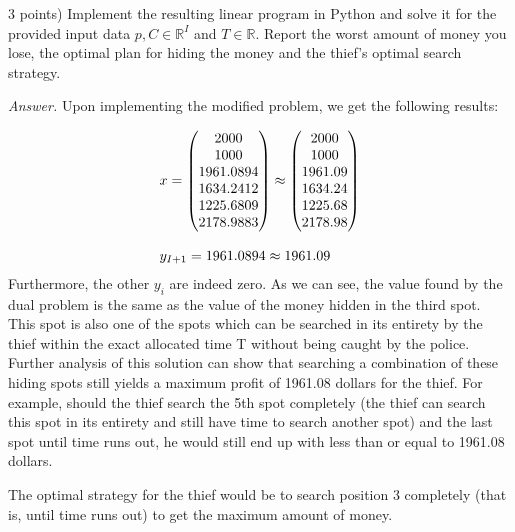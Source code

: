 \documentclass[10pt]{article}
\newenvironment{exercise}[2][Exercise]{\begin{trivlist}
  \item[\hskip \labelsep {\bfseries #1}\hskip \labelsep {\bfseries #2.}]}{\end{trivlist}}
\begin{document}
\begin{exercise}{5.5} (3 points) Implement the resulting linear program in Python and solve it for the provided input data $p, C \in \mathbb{R}^I$ and $T \in \mathbb{R}$. Report the worst amount of money you lose, the optimal plan for hiding the money and the thief's optimal search strategy. 

\textit{Answer.}
Upon implementing the modified problem, we get the following results:

\begin{equation}
\begin{array}{ll@{}lll}
x = \begin{pmatrix}
2000\\
1000\\
1961.0894\\
1634.2412\\
1225.6809\\
2178.9883\\
\end{pmatrix} 
\approx 
\begin{pmatrix}
2000\\
1000\\
1961.09\\
1634.24\\
1225.68\\
2178.98\\
\end{pmatrix}

\\ \\

y_{I+1} = 1961.0894 \approx 1961.09
\end{array}
\end{equation}
Furthermore, the other $y_i$ are indeed zero. As we can see, the value found by the dual problem is the same as the value of the money hidden in the third spot. This spot is also one of the spots which can be searched in its entirety by the thief within the exact allocated time T without being caught by the police. Further analysis of this solution can show that searching a combination of these hiding spots still yields a maximum profit of 1961.08 dollars for the thief. For example, should the thief search the 5th spot completely (the thief can search this spot in its entirety and still have time to search another spot) and the last spot until time runs out, he would still end up with less than or equal to 1961.08 dollars.

The optimal strategy for the thief would be to search position 3 completely (that is, until time runs out) to get the maximum amount of money.




\end{exercise}
\end{document}
